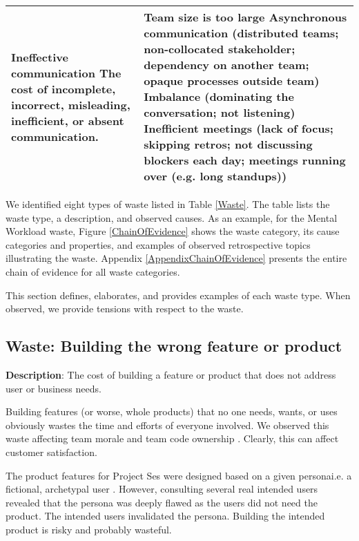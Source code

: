 \begin{table*}[htbp]
\begin{tabular}{|p{2.5in}|p{3.6in}|}
\textbf{Ineffective communication} \newline
The cost of incomplete, incorrect, misleading, inefficient, or absent communication.                         & Team size is too large \newline 
Asynchronous communication (distributed teams; non-collocated stakeholder; dependency on another team; opaque processes outside team) \newline 
Imbalance (dominating the conversation; not listening) \newline
Inefficient meetings (lack of focus; skipping retros; not discussing blockers each day; meetings running over (e.g. long standups)) 
\\ \hline                  
\end{tabular} 
\end{table*}


We identified eight types of waste listed in Table \ref{Waste}. The table lists the waste type, a description, and observed causes. As an example, for the Mental Workload waste, Figure \ref{ChainOfEvidence} shows the waste category, its cause categories and properties, and examples of observed retrospective topics illustrating the waste. Appendix \ref{AppendixChainOfEvidence} presents the entire chain of evidence for all waste categories.

This section defines, elaborates, and provides examples of each waste type. When observed, we provide tensions with respect to the waste.

\subsection{Waste: Building the wrong feature or product}
\textbf{Description}: The cost of building a feature or product that does not address user or business needs.

Building features (or worse, whole products) that no one needs, wants, or uses obviously wastes the time and efforts of everyone involved. We observed this waste affecting team morale and team code ownership \cite{SedanoTeamCodeOwnership}. Clearly, this can affect customer satisfaction. 

The product features for Project Ses were designed based on a given persona\textemdash i.e. a fictional, archetypal user \cite{Grudin2002personas}. However, consulting several real intended users revealed that the persona was deeply flawed as the users did not need the product. The intended users invalidated the persona. Building the intended product is risky and probably wasteful. 

